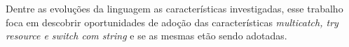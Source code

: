Dentre as evoluções da linguagem as características investigadas, esse trabalho foca em descobrir oportunidades de adoção das características \textit{multicatch, try resource e switch com string} e se as mesmas etão sendo adotadas.
%
%



%



